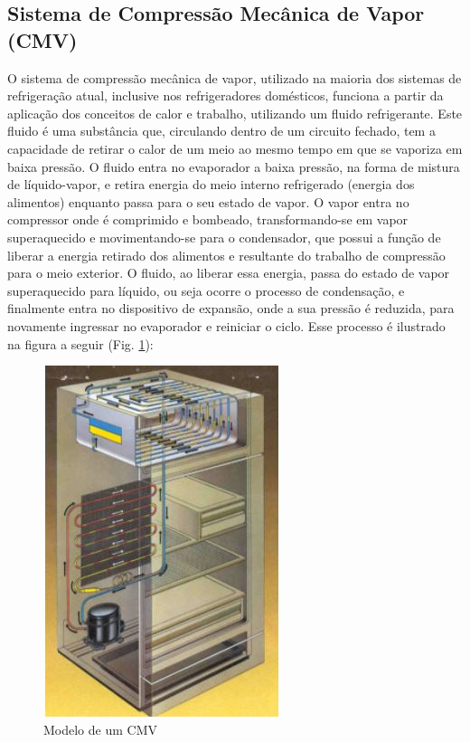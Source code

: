 		\subsection{Sistema de Compressão Mecânica de Vapor (CMV)}
		O sistema de compressão mecânica de vapor, utilizado na maioria dos sistemas de refrigeração atual, inclusive nos refrigeradores domésticos, funciona a partir da aplicação dos conceitos de calor e trabalho, utilizando um fluido refrigerante. Este fluido é uma substância que, circulando dentro de um circuito fechado, tem a capacidade de retirar o calor de um meio ao mesmo tempo em que se vaporiza em baixa pressão. O fluido entra no evaporador a baixa pressão, na forma de mistura de líquido-vapor, e retira energia do meio interno refrigerado (energia dos alimentos) enquanto passa para o seu estado de vapor. O vapor entra no compressor onde é comprimido e bombeado, transformando-se em vapor superaquecido e movimentando-se para o condensador, que possui a função de liberar a  energia retirado dos alimentos e resultante do trabalho de compressão para o meio exterior. O fluido, ao liberar essa energia, passa do estado de vapor superaquecido para líquido, ou seja ocorre o processo de condensação, e finalmente entra no dispositivo de expansão, onde a sua pressão é reduzida, para novamente ingressar no evaporador e reiniciar o ciclo. Esse processo é ilustrado na figura a seguir (Fig. \ref{geladeira}):
		
		\begin{figure}[H]
		\begin{center}
			\includegraphics[scale =0.75]{figuras/Geladeira}
			\caption{Modelo de um CMV} \label{geladeira}
		\end{center}
		\end{figure}
			
